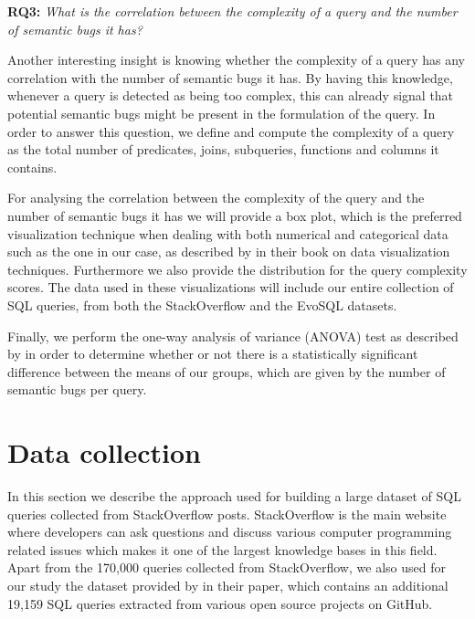 \begin{mdframed}
\noindent \textbf{RQ3:} \emph{What is the correlation between the complexity of a query and the number of semantic bugs it has?}
\end{mdframed}

Another interesting insight is knowing whether the complexity of a query has any correlation with the number of semantic bugs it has. By having this knowledge, whenever a query is detected as being too complex, this can already signal that potential semantic bugs might be present in the formulation of the query. In order to answer this question, we define and compute the complexity of a query as the total number of predicates, joins, subqueries, functions and columns it contains.

For analysing the correlation between the complexity of the query and the number of semantic bugs it has we will provide a box plot, which is the preferred visualization technique when dealing with both numerical and categorical data such as the one in our case, as described by \citet{P992} in their book on data visualization techniques. Furthermore we also provide the distribution for the query complexity scores. The data used in these visualizations will include our entire collection of SQL queries, from both the StackOverflow and the EvoSQL datasets.

Finally, we perform the one-way analysis of variance (ANOVA) test as described by \citet{P991} in order to determine whether or not there is a statistically significant difference between the means of our groups, which are given by the number of semantic bugs per query.

\section{Data collection}
\label{section:data_collection}
In this section we describe the approach used for building a large dataset of SQL queries collected from StackOverflow posts. StackOverflow is the main website where developers can ask questions and discuss various computer programming related issues which makes it one of the largest knowledge bases in this field. Apart from the 170,000 queries collected from StackOverflow, we also used for our study the dataset provided by \citet{P011} in their paper, which contains an additional 19,159 SQL queries extracted from various open source projects on GitHub.

